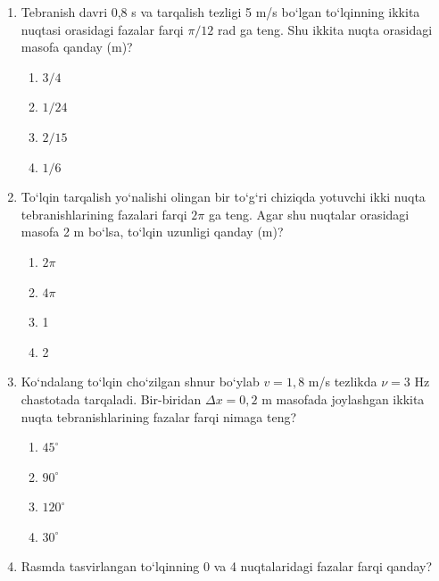 \begin{enumerate}
\item Tebranish davri 0,8 s va tarqalish tezligi 5 m/s bo‘lgan to‘lqinning ikkita nuqtasi orasidagi fazalar farqi $\pi/12$ rad ga teng. Shu ikkita nuqta orasidagi masofa qanday (m)?
\begin{enumerate}[label=\Alph*)]
\item $3/4$
\item $1/24$
\item $2/15$
\item $1/6$
\end{enumerate}

\item To‘lqin tarqalish yo‘nalishi olingan bir to‘g‘ri chiziqda yotuvchi ikki nuqta tebranishlarining fazalari farqi $2\pi$ ga teng. Agar shu nuqtalar orasidagi masofa 2 m bo‘lsa, to‘lqin uzunligi qanday (m)?
\begin{enumerate}[label=\Alph*)]
\item $2\pi$
\item $4\pi$
\item 1
\item 2
\end{enumerate}

\item Ko‘ndalang to‘lqin cho‘zilgan shnur bo‘ylab $v=1,8$ m/s tezlikda $\nu=3$ Hz chastotada tarqaladi. Bir-biridan $\Delta x=0,2$ m masofada joylashgan ikkita nuqta tebranishlarining fazalar farqi nimaga teng?
\begin{enumerate}[label=\Alph*)]
\item $45^\circ$
\item $90^\circ$
\item $120^\circ$
\item $30^\circ$
\end{enumerate}

\item Rasmda tasvirlangan to‘lqinning 0 va 4 nuqtalaridagi fazalar farqi qanday?

\end{enumerate}
